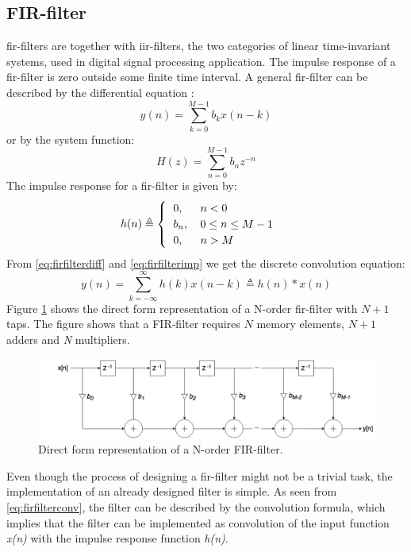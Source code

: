 \subsection{\label{subsec:refdesfir}FIR-filter}
\gls{fir}-filters are together with \gls{iir}-filters, the two categories of linear time-invariant systems, used in digital signal processing application. The impulse response of a \gls{fir}-filter is zero outside some finite time interval. 
A general \gls{fir}-filter can be described by the differential equation \cite{proakis2007digital}:
\begin{equation}
    y(n)=\sum\limits_{k=0}^{M-1} b_kx(n-k)
    \label{eq:firfilterdiff}
\end{equation}
or by the system function:
\begin{equation}
    H(z)=\sum\limits_{n=0}^{M-1} b_nz^{-n}
    \label{eq:firfiltersys}
\end{equation}
The impulse response for a \gls{fir}-filter is given by:
\begin{equation}
    h(n)\triangleq
    \begin{cases}
    \begin{tabular}{ll}
      $0,$ & $n < 0$  \\
      $b_n,$ & $0 \leq n \leq M-1$  \\
      $0,$ & $n > M$   
      \end{tabular}
    \end{cases}
    \label{eq:firfilterimp}
\end{equation}
From \cref{eq:firfilterdiff} and \cref{eq:firfilterimp} we get the discrete convolution equation:
\begin{equation}
    y(n)=\sum\limits_{k=-\infty}^{\infty} h(k)x(n-k) \triangleq h(n) \ast x(n)
    \label{eq:firfilterconv}
\end{equation}
\noindent
Figure \ref{fig:firfilter} shows the direct form representation of a N-order \gls{fir}-filter with $N+1$ taps. The figure shows that a FIR-filter requires $N$ memory elements, $N+1$ adders and \textit{N} multipliers. 
\begin{figure}[hbpt]
\centering
\includegraphics[width=\textwidth]{../figs/FIRFilter.png}
\caption{\label{fig:firfilter}Direct form representation of a N-order FIR-filter.}
\end{figure}


Even though the process of designing a \gls{fir}-filter might not be a trivial task, the implementation of an already designed filter is simple. As seen from \cref{eq:firfilterconv}, the filter can be described by the convolution formula, which implies that the filter can be implemented as convolution of the input function \textit{x(n)} with the impulse response function \textit{h(n)}.